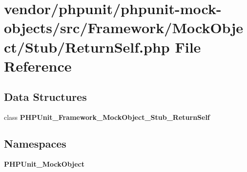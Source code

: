 \section{vendor/phpunit/phpunit-\/mock-\/objects/src/\+Framework/\+Mock\+Object/\+Stub/\+Return\+Self.php File Reference}
\label{_return_self_8php}
\subsection*{Data Structures}
\begin{DoxyCompactItemize}
\item 
class {\bf P\+H\+P\+Unit\+\_\+\+Framework\+\_\+\+Mock\+Object\+\_\+\+Stub\+\_\+\+Return\+Self}
\end{DoxyCompactItemize}
\subsection*{Namespaces}
\begin{DoxyCompactItemize}
\item 
 {\bf P\+H\+P\+Unit\+\_\+\+Mock\+Object}
\end{DoxyCompactItemize}
